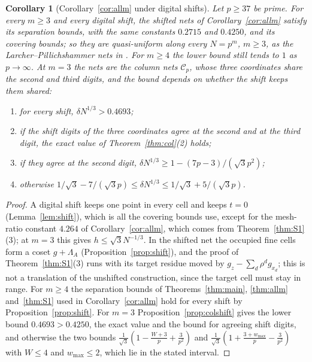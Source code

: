 \documentclass[11pt]{amsart}
\newtheorem{corollary}[theorem]{Corollary}
\theoremstyle{definition}
\theoremstyle{plain}
\begin{document}
\begin{corollary}[Corollary~\ref{cor:allm} under digital shifts]\label{cor:allmshift}
Let $p\ge37$ be prime. For every $m\ge3$ and every digital shift, the shifted nets of Corollary~\ref{cor:allm} satisfy its separation bounds, with the same constants $0.2715$ and $0.4250$, and its covering bounds; so they are quasi-uniform along every $N=p^m$, $m\ge3$, as the Larcher--Pillichshammer nets in \cite[Thm.~3.11]{DGS2}. For $m\ge4$ the lower bound still tends to $1$ as $p\to\infty$. At $m=3$ the nets are the column nets $\mathcal C_p$, whose three coordinates share the second and third digits, and the bound depends on whether the shift keeps them shared:
\begin{enumerate}
\item[(a)] for every shift, $\delta N^{1/3}>0.4693$;
\item[(b)] if the shift digits of the three coordinates agree at the second and at the third digit, the exact value of Theorem~\ref{thm:col}(2) holds;
\item[(c)] if they agree at the second digit, $\delta N^{1/3}\ge1-(7p-3)/(\sqrt3p^2)$;
\item[(d)] otherwise $1/\sqrt3-7/(\sqrt3p)\le\delta N^{1/3}\le1/\sqrt3+5/(\sqrt3p)$.
\end{enumerate}
\end{corollary}

\begin{proof}
A digital shift keeps one point in every cell and keeps $t=0$ (Lemma~\ref{lem:shift}), which is all the covering bounds use, except for the mesh-ratio constant $4.264$ of Corollary~\ref{cor:allm}, which comes from Theorem~\ref{thm:S1}(3); at $m=3$ this gives $h\le\sqrt3N^{-1/3}$. In the shifted net the occupied fine cells form a coset $g+\Lambda_A$ (Proposition~\ref{prop:shift}), and the proof of Theorem~\ref{thm:S1}(3) runs with its target residue moved by $g_z-\sum_d\rho^dg_{x_d}$; this is not a translation of the unshifted construction, since the target cell must stay in range. For $m\ge4$ the separation bounds of Theorems~\ref{thm:main}, \ref{thm:allm} and~\ref{thm:S1} used in Corollary~\ref{cor:allm} hold for every shift by Proposition~\ref{prop:shift}. For $m=3$ Proposition~\ref{prop:colshift} gives the lower bound $0.4693>0.4250$, the exact value and the bound for agreeing shift digits, and otherwise the two bounds $\frac1{\sqrt3}(1-\frac{W+3}p+\frac3{p^2})$ and $\frac1{\sqrt3}(1+\frac{3+w_{\max}}p-\frac3{p^2})$ with $W\le4$ and $w_{\max}\le2$, which lie in the stated interval.
\end{proof}
\end{document}
